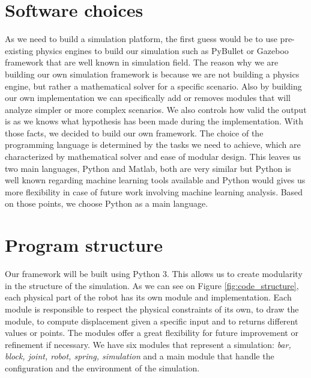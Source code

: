 
    \section{Software choices}
        As we need to build a simulation platform, the first guess would be to use pre-existing physics engines to build our simulation such as PyBullet or Gazeboo framework that are well known in simulation field. The reason why we are building our own simulation framework is because we are not building a physics engine, but rather a mathematical solver for a specific scenario. Also by building our own implementation we can specifically add or removes modules that will analyze simpler or more complex scenarios. We also controls how valid the output is as we knows what hypothesis has been made during the implementation. With those facts, we decided to build our own framework. The choice of the programming language is determined by the tasks we need to achieve, which are characterized by mathematical solver and ease of modular design. This leaves us two main languages, Python and Matlab, both are very similar but Python is well known regarding machine learning tools available and Python would gives us more flexibility in case of future work involving machine learning analysis. Based on those points, we choose Python as a main language. 
    
    \section{Program structure}\label{sec:program_structure}
        Our framework will be built using Python 3. This allows us to create modularity in the structure of the simulation. As we can see on Figure \ref{fig:code_structure}, each physical part of the robot has its own module and implementation. Each module is responsible to respect the physical constraints of its own, to draw the module, to compute displacement given a specific input and to returns different values or points. The modules offer a great flexibility for future improvement or refinement if necessary. We have six modules that represent a simulation: \textit{bar, block, joint, robot, spring, simulation} and a main module that handle the configuration and the environment of the simulation. \\
        
